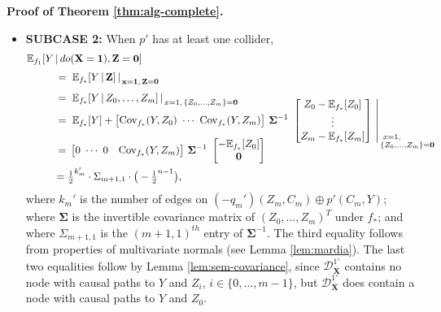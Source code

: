 \documentclass[11pt]{article}
\DeclareMathOperator{\Cov}{Cov}
\newcommand{\mb}[1]{\mathbf{#1}}
\newcommand{\g}[1][G]{\mathcal{#1}}
\newcommand{\E}{\mathbb{E}}
\newenvironment{proofofnoqed}[1][]{\noindent \textbf{Proof of #1.}}{}
\begin{document}
\begin{proofofnoqed}[Theorem \ref{thm:alg-complete}]
\begin{itemize}
        \item \textbf{SUBCASE 2:}
        When $p'$ has at least one collider,
        \begin{align*}
            \E_{f_1}[Y &\,|\, do(\mb{X}= \mb{1}), \mb{Z}= \mb{0}]\\[.1cm]
                    &\,=\, \left. \E_{f_*}[Y \,|\, \mb{Z}] \, \right\rvert_{\, \mb{x}=\mb{1}, \, \mb{Z}=\mb{0}}\\[.1cm]
                    &\,=\, \left. \E_{f_*}[Y \,|\, Z_0, \dots, Z_m] \, \right\rvert_{\, x=1, \, \{Z_0, \dots, Z_m\}=\mb{0}}\\[-.4cm]
                    &\,=\, \left. \E_{f_*}[Y] + 
                                  \begin{bmatrix}
                                        \Cov_{f_*}(Y,Z_0) \,\, \cdots \,\, \Cov_{f_*}(Y, Z_m) 
                                  \end{bmatrix} \,
                                        \mb{\Sigma}^{-1} \,\, 
                                  \begin{bmatrix}
                                        Z_0-\E_{f_*}[Z_0]\\
                                        \vdots\\
                                        Z_m-\E_{f_*}[Z_m]
                                  \end{bmatrix} \,\, \right|_{\, \begin{subarray}{l} \,\, x=1, \\ \{Z_0, \dots, Z_m\}=\mb{0}\end{subarray}}\\[-.5cm]
                    &\,=\, \begin{bmatrix}
                                0 \,\, \cdots \,\, 0 & \Cov_{f_*}(Y, Z_m)
                            \end{bmatrix}\,
                                \mb{\Sigma}^{-1} \,\,
                            \begin{bmatrix}
                                -\E_{f_*}[Z_0] \\
                                \mathbf{0}
                            \end{bmatrix}\\
                    &= \tfrac{1}{2}^{k_m'} \cdot \Sigma_{m+1,1} \cdot \big(- \tfrac{1}{2}^{n -1}\big),
        \end{align*}      
        where $k_m'$ is the number of edges on $(-q_m')(Z_m,C_m) \oplus p'(C_m,Y)$; where $\mb{\Sigma}$ is the invertible covariance matrix of $(Z_0, \dots, Z_m)^T$ under $f_*$; and where $\Sigma_{m+1,1}$ is the $(m+1,1)^{th}$ entry of $\mb{\Sigma}^{-1}$. The third equality follows from properties of multivariate normals (see Lemma \ref{lem:mardia}). The last two equalities follow by Lemma \ref{lem:sem-covariance}, since $\g[D]^{1'}_{\overline{\mb{X}}}$ contains no node with causal paths to $Y$ and $Z_i$, $i \in \{0, \dots, m-1\}$, but $\g[D]^{1'}_{\overline{\mb{X}}}$ does contain a node with causal paths to $Y$ and $Z_0$.


\end{itemize}
\end{proofofnoqed}
\end{document}
